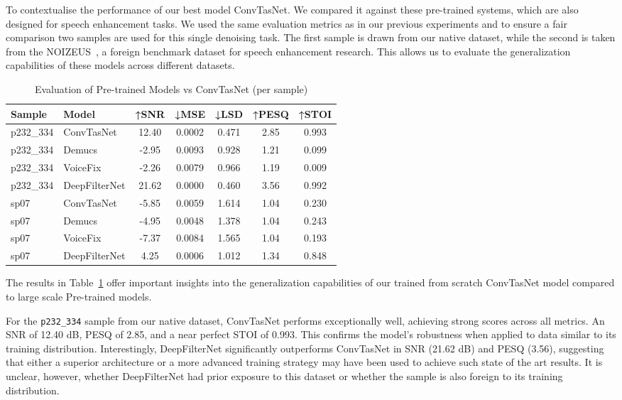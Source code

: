 To contextualise the performance of our best model ConvTasNet. We compared it against these pre-trained systems, which are also designed for speech enhancement tasks. We used the same evaluation metrics as in our previous experiments and to ensure a fair comparison two samples are used for this single denoising task. The first sample is drawn from our native dataset, while the second is taken from the NOIZEUS~\cite{hu2007subjective}, a foreign benchmark dataset for speech enhancement research. This allows us to evaluate the generalization capabilities of these models across different datasets.

\vspace{1em}
\begin{table}[H]
\centering
\caption{Evaluation of Pre-trained Models vs ConvTasNet (per sample)}
\label{tab:pretrained_eval}
\begin{tabular}{|l|l|c|c|c|c|c|}
\hline
\textbf{Sample} & \textbf{Model} & \textbf{↑SNR} & \textbf{↓MSE} & \textbf{↓LSD} & \textbf{↑PESQ} & \textbf{↑STOI} \\
\hline
p232\_334 & ConvTasNet      & 12.40 & 0.0002 & 0.471 & 2.85 & 0.993 \\
p232\_334 & Demucs          & -2.95 & 0.0093 & 0.928 & 1.21 & 0.099 \\
p232\_334 & VoiceFix        & -2.26 & 0.0079 & 0.966 & 1.19 & 0.009 \\
p232\_334 & DeepFilterNet   & 21.62 & 0.0000 & 0.460 & 3.56 & 0.992 \\
\hline
sp07      & ConvTasNet      & -5.85 & 0.0059 & 1.614 & 1.04 & 0.230 \\
sp07      & Demucs          & -4.95 & 0.0048 & 1.378 & 1.04 & 0.243 \\
sp07      & VoiceFix        & -7.37 & 0.0084 & 1.565 & 1.04 & 0.193 \\
sp07      & DeepFilterNet   & 4.25  & 0.0006 & 1.012 & 1.34 & 0.848 \\
\hline
\end{tabular}
\end{table}


The results in Table~\ref{tab:pretrained_eval} offer important insights into the generalization capabilities of our trained from scratch ConvTasNet model compared to large scale Pre-trained models.

For the \texttt{p232\_334} sample from our native dataset, ConvTasNet performs exceptionally well, achieving strong scores across all metrics. An SNR of 12.40 dB, PESQ of 2.85, and a near perfect STOI of 0.993. This confirms the model’s robustness when applied to data similar to its training distribution. Interestingly, DeepFilterNet significantly outperforms ConvTasNet in SNR (21.62 dB) and PESQ (3.56), suggesting that either a superior architecture or a more advanced training strategy may have been used to achieve such state of the art results. It is unclear, however, whether DeepFilterNet had prior exposure to this dataset or whether the sample is also foreign to its training distribution.

